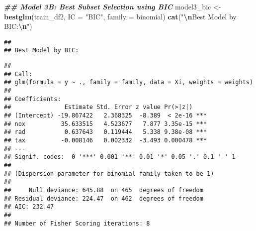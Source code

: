\documentclass[
]{article}
\newenvironment{Shaded}{\begin{snugshade}}{\end{snugshade}}
\newcommand{\AttributeTok}[1]{\textcolor[rgb]{0.13,0.29,0.53}{#1}}
\newcommand{\CommentTok}[1]{\textcolor[rgb]{0.56,0.35,0.01}{\textit{#1}}}
\newcommand{\DocumentationTok}[1]{\textcolor[rgb]{0.56,0.35,0.01}{\textbf{\textit{#1}}}}
\newcommand{\FunctionTok}[1]{\textcolor[rgb]{0.13,0.29,0.53}{\textbf{#1}}}
\newcommand{\NormalTok}[1]{#1}
\newcommand{\OtherTok}[1]{\textcolor[rgb]{0.56,0.35,0.01}{#1}}
\newcommand{\SpecialCharTok}[1]{\textcolor[rgb]{0.81,0.36,0.00}{\textbf{#1}}}
\newcommand{\StringTok}[1]{\textcolor[rgb]{0.31,0.60,0.02}{#1}}
\begin{document}
\begin{Shaded}
\begin{Highlighting}[]
\DocumentationTok{\#\# Model 3B: Best Subset Selection using BIC}
\NormalTok{model3\_bic }\OtherTok{\textless{}{-}} \FunctionTok{bestglm}\NormalTok{(train\_df2, }\AttributeTok{IC =} \StringTok{"BIC"}\NormalTok{, }\AttributeTok{family =}\NormalTok{ binomial)}
\FunctionTok{cat}\NormalTok{(}\StringTok{"}\SpecialCharTok{\textbackslash{}n}\StringTok{Best Model by BIC:}\SpecialCharTok{\textbackslash{}n}\StringTok{"}\NormalTok{)}
\end{Highlighting}
\end{Shaded}

\begin{verbatim}
## 
## Best Model by BIC:
\end{verbatim}

\begin{Shaded}
\end{Shaded}

\begin{verbatim}
## 
## Call:
## glm(formula = y ~ ., family = family, data = Xi, weights = weights)
## 
## Coefficients:
##               Estimate Std. Error z value Pr(>|z|)    
## (Intercept) -19.867422   2.368325  -8.389  < 2e-16 ***
## nox          35.633515   4.523677   7.877 3.35e-15 ***
## rad           0.637643   0.119444   5.338 9.38e-08 ***
## tax          -0.008146   0.002332  -3.493 0.000478 ***
## ---
## Signif. codes:  0 '***' 0.001 '**' 0.01 '*' 0.05 '.' 0.1 ' ' 1
## 
## (Dispersion parameter for binomial family taken to be 1)
## 
##     Null deviance: 645.88  on 465  degrees of freedom
## Residual deviance: 224.47  on 462  degrees of freedom
## AIC: 232.47
## 
## Number of Fisher Scoring iterations: 8
\end{verbatim}

\begin{Shaded}
\end{Shaded}
\end{document}

